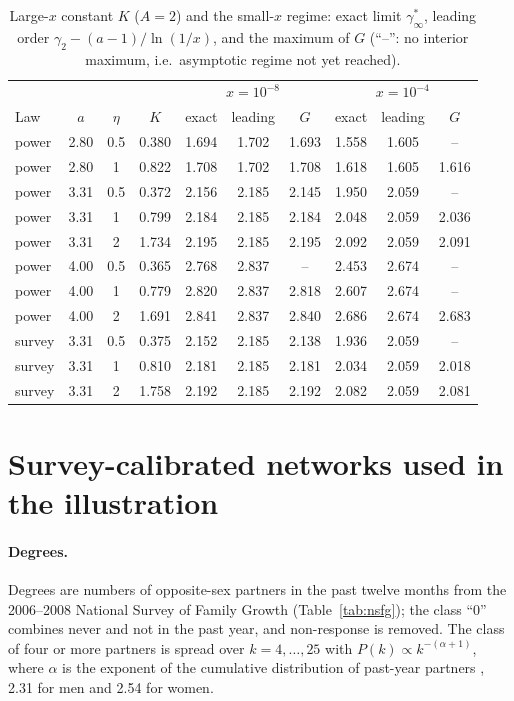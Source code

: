 \documentclass[pre,onecolumn,superscriptaddress,amsmath,amssymb,floatfix]{revtex4-2}
\theoremstyle{definition}
\theoremstyle{remark}
\begin{document}
\begin{table}[h]
\caption{Large-$x$ constant $K$ ($A=2$) and the small-$x$ regime: exact limit
$\gamma^*_\infty$, leading order $\gamma_2-(a-1)/\ln(1/x)$, and the maximum of $G$ (``--'': no
interior maximum, i.e.\ asymptotic regime not yet reached).}
\begin{ruledtabular}
\begin{tabular}{lccc ccc ccc}
 & & & & \multicolumn{3}{c}{$x=10^{-8}$} & \multicolumn{3}{c}{$x=10^{-4}$} \\
Law & $a$ & $\eta$ & $K$ & exact & leading & $G$ & exact & leading & $G$ \\
\hline
power & 2.80 & 0.5 & 0.380 & 1.694 & 1.702 & 1.693 & 1.558 & 1.605 & -- \\
power & 2.80 & 1 & 0.822 & 1.708 & 1.702 & 1.708 & 1.618 & 1.605 & 1.616 \\
power & 3.31 & 0.5 & 0.372 & 2.156 & 2.185 & 2.145 & 1.950 & 2.059 & -- \\
power & 3.31 & 1 & 0.799 & 2.184 & 2.185 & 2.184 & 2.048 & 2.059 & 2.036 \\
power & 3.31 & 2 & 1.734 & 2.195 & 2.185 & 2.195 & 2.092 & 2.059 & 2.091 \\
power & 4.00 & 0.5 & 0.365 & 2.768 & 2.837 & -- & 2.453 & 2.674 & -- \\
power & 4.00 & 1 & 0.779 & 2.820 & 2.837 & 2.818 & 2.607 & 2.674 & -- \\
power & 4.00 & 2 & 1.691 & 2.841 & 2.837 & 2.840 & 2.686 & 2.674 & 2.683 \\
survey & 3.31 & 0.5 & 0.375 & 2.152 & 2.185 & 2.138 & 1.936 & 2.059 & -- \\
survey & 3.31 & 1 & 0.810 & 2.181 & 2.185 & 2.181 & 2.034 & 2.059 & 2.018 \\
survey & 3.31 & 2 & 1.758 & 2.192 & 2.185 & 2.192 & 2.082 & 2.059 & 2.081 \\
\end{tabular}
\end{ruledtabular}
\end{table}

\section{Survey-calibrated networks used in the illustration}
\paragraph{Degrees.} Degrees are numbers of opposite-sex partners in the past
twelve months from the 2006--2008 National Survey of Family Growth
\cite{chandra2011sexual} (Table~\ref{tab:nsfg}); the class ``0'' combines never
and not in the past year, and non-response is removed. The class of four or more
partners is spread over $k=4,\dots,25$ with $P(k)\propto k^{-(\alpha+1)}$, where $\alpha$ is the
exponent of the cumulative distribution of past-year partners
\cite{liljeros2001web}, 2.31 for men and 2.54 for women.
\end{document}
